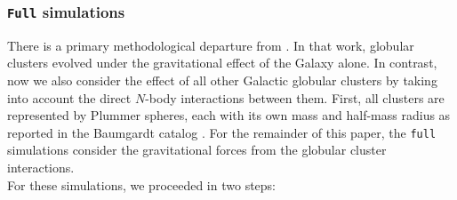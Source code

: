         \subsubsection{ \texttt{Full} simulations}
            There is a primary methodological departure from \citet{2023A&A...673A..44F}.  In that work, globular clusters evolved under the gravitational effect of the Galaxy alone. In contrast, now we also consider the effect of all other Galactic globular clusters by taking into account the direct $N$-body interactions between them. First, all clusters are represented by Plummer spheres, each with its own mass and half-mass radius as reported in the Baumgardt catalog \citep{2021MNRAS.505.5957B}. For the remainder of this paper, the \texttt{full} simulations consider the gravitational forces from the globular cluster interactions. \\
            For these simulations, we proceeded in two steps:
